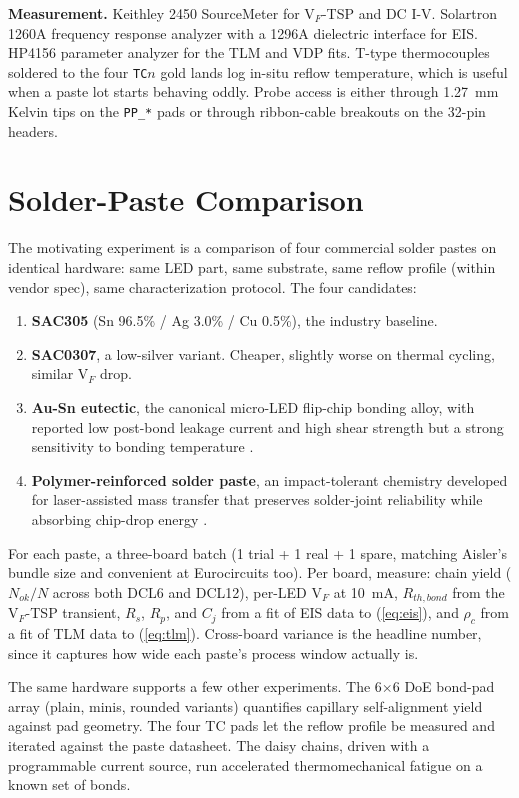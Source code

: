 \documentclass[conference]{IEEEtran}
\begin{document}
\textbf{Measurement.} Keithley 2450 SourceMeter for V$_F$-TSP and DC I-V.
Solartron 1260A frequency response analyzer with a 1296A dielectric
interface for EIS. HP4156 parameter analyzer for the TLM and VDP fits.
T-type thermocouples soldered to the four \texttt{TC$n$} gold lands log
in-situ reflow temperature, which is useful when a paste lot starts
behaving oddly. Probe access is either through 1.27~mm Kelvin tips on the
\texttt{PP\_*} pads or through ribbon-cable breakouts on the 32-pin
headers.

\section{Solder-Paste Comparison}

The motivating experiment is a comparison of four commercial solder pastes
on identical hardware: same LED part, same substrate, same reflow profile
(within vendor spec), same characterization protocol. The four candidates:
\begin{enumerate}
  \item \textbf{SAC305} (Sn 96.5\% / Ag 3.0\% / Cu 0.5\%), the industry baseline.
  \item \textbf{SAC0307}, a low-silver variant. Cheaper, slightly worse on
        thermal cycling, similar V$_F$ drop.
  \item \textbf{Au-Sn eutectic}, the canonical micro-LED flip-chip
        bonding alloy, with reported low post-bond leakage current and
        high shear strength but a strong sensitivity to bonding
        temperature \cite{yin2024ausn}.
  \item \textbf{Polymer-reinforced solder paste}, an impact-tolerant
        chemistry developed for laser-assisted mass transfer that
        preserves solder-joint reliability while absorbing chip-drop
        energy \cite{ji2023polymer}.
\end{enumerate}
For each paste, a three-board batch (1 trial + 1 real + 1 spare, matching
Aisler's bundle size and convenient at Eurocircuits too). Per board,
measure: chain yield ($N_{ok}/N$ across
both DCL6 and DCL12), per-LED V$_F$ at 10~mA, $R_{th,bond}$ from the
V$_F$-TSP transient, $R_s$, $R_p$, and $C_j$ from a fit of EIS data to
(\ref{eq:eis}), and $\rho_c$ from a fit of TLM data to (\ref{eq:tlm}).
Cross-board variance is the headline number, since it captures how wide
each paste's process window actually is.

The same hardware supports a few other experiments. The 6$\times$6 DoE
bond-pad array (plain, minis, rounded variants) quantifies capillary
self-alignment yield against pad geometry. The four TC pads let the
reflow profile be measured and iterated against the paste datasheet. The
daisy chains, driven with a programmable current source, run accelerated
thermomechanical fatigue on a known set of bonds.
\end{document}
